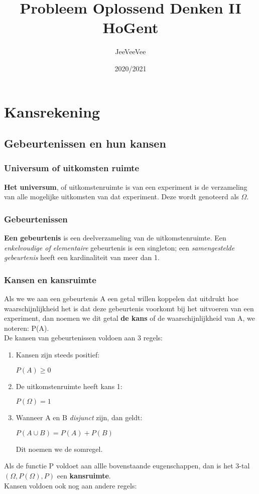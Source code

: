 \documentclass{report}
\title{Probleem Oplossend Denken II\\ HoGent}
\author{JeeVeeVee}
\date{2020/2021}
\begin{document}
	\maketitle
   	\tableofcontents
   	\chapter{Kansrekening}
   		\section{Gebeurtenissen en hun kansen}
   			\subsection{Universum of uitkomsten ruimte}
   				\textbf{Het universum}, of uitkomstenruimte is van een experiment is de verzameling van alle mogelijke uitkomsten van dat experiment. Deze wordt genoteerd als $\Omega$.
   			\subsection{Gebeurtenissen}
   				\textbf{Een gebeurtenis} is een deelverzameling van de uitkomstenruimte. Een \textit{enkelvoudige of elementaire} gebeurtenis is een singleton; een \textit{samengestelde gebeurtenis} heeft een kardinaliteit van meer dan 1.
   			\subsection{Kansen en kansruimte}
	   			Als we we aan een gebeurtenis A een getal willen koppelen dat uitdrukt hoe waarschijnlijkheid het is dat deze gebeurtenis voorkomt bij het uitvoeren van een experiment, dan noemen we dit getal \textbf{de kans} of de waarschijnlijkheid van A, we noteren: P(A).
	   			\\
	   			De kansen van gebeurtenissen voldoen aan 3 regels: 
	   			\begin{enumerate}
	   				\item Kansen zijn steeds positief: 
	   				\begin{center}
	   					$P(A) \geq 0$
	   				\end{center}
   					\item De uitkomstenruimte heeft kans 1: 
   					\begin{center}
   						$P(\Omega) = 1$
   					\end{center}
   					\item Wanneer A en B \textit{disjunct} zijn, dan geldt: 
   					\begin{center}
   						$P(A \cup B) = P(A) + P(B)$
   					\end{center}
   					Dit noemen we de somregel.
	   			\end{enumerate}
  				Als de functie P voldoet aan allle bovenstaande eugenschappen, dan is het 3-tal $(\Omega, P(\Omega), P)$ een \textbf{kansruimte}.
  				\\
  				Kansen voldoen ook nog aan andere regels:
	  				
\end{document}
